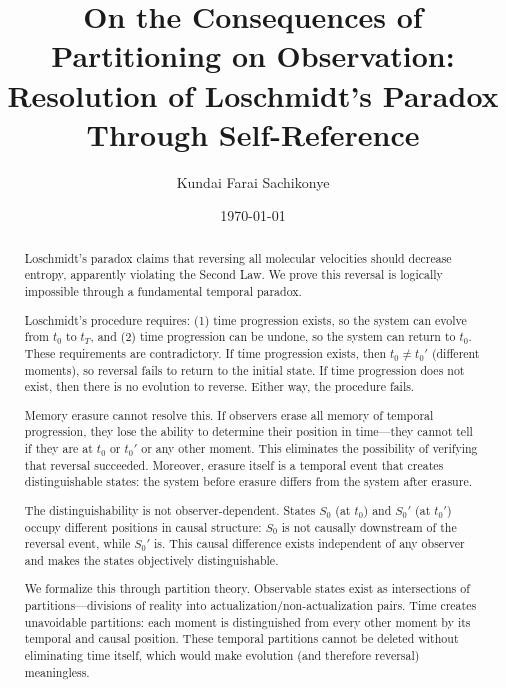 \documentclass[twocolumn,10pt]{article}
\theoremstyle{definition}
\theoremstyle{remark}
\begin{document}
\title{\vspace{-1cm}\textbf{On the Consequences of Partitioning on Observation: Resolution of Loschmidt's Paradox Through Self-Reference}}

\author[1]{Kundai Farai Sachikonye}

\date{\today}

\maketitle

\begin{abstract}
\noindent Loschmidt's paradox claims that reversing all molecular velocities should decrease entropy, apparently violating the Second Law. We prove this reversal is logically impossible through a fundamental temporal paradox.

\vspace{0.2cm}
\noindent Loschmidt's procedure requires: (1) time progression exists, so the system can evolve from $t_0$ to $t_T$, and (2) time progression can be undone, so the system can return to $t_0$. These requirements are contradictory. If time progression exists, then $t_0 \neq t_0'$ (different moments), so reversal fails to return to the initial state. If time progression does not exist, then there is no evolution to reverse. Either way, the procedure fails.

\vspace{0.2cm}
\noindent Memory erasure cannot resolve this. If observers erase all memory of temporal progression, they lose the ability to determine their position in time—they cannot tell if they are at $t_0$ or $t_0'$ or any other moment. This eliminates the possibility of verifying that reversal succeeded. Moreover, erasure itself is a temporal event that creates distinguishable states: the system before erasure differs from the system after erasure.

\vspace{0.2cm}
\noindent The distinguishability is not observer-dependent. States $S_0$ (at $t_0$) and $S_0'$ (at $t_0'$) occupy different positions in causal structure: $S_0$ is not causally downstream of the reversal event, while $S_0'$ is. This causal difference exists independent of any observer and makes the states objectively distinguishable.

\vspace{0.2cm}
\noindent We formalize this through partition theory. Observable states exist as intersections of partitions—divisions of reality into actualization/non-actualization pairs. Time creates unavoidable partitions: each moment is distinguished from every other moment by its temporal and causal position. These temporal partitions cannot be deleted without eliminating time itself, which would make evolution (and therefore reversal) meaningless.


\end{abstract}
\end{document}
